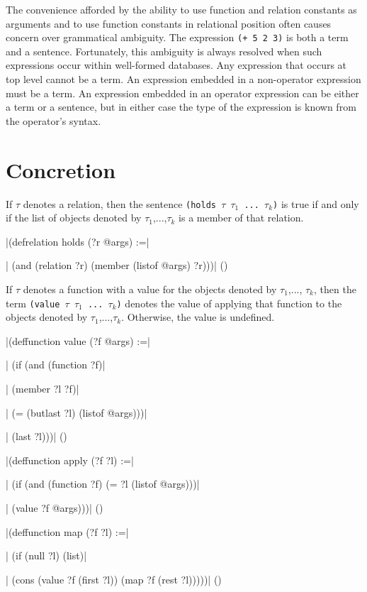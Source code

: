 The convenience afforded by the ability to use function and relation
constants as arguments and to use function constants in relational
position often causes concern over grammatical ambiguity.  The
expression {\tt (+ 5 2 3)} is both a term and a sentence.  Fortunately,
this ambiguity is always resolved when such expressions occur within
well-formed databases.  Any expression that occurs at top level cannot
be a term.  An expression embedded in a non-operator expression must be
a term.  An expression embedded in an operator expression can be either
a term or a sentence, but in either case the type of the expression is
known from the operator's syntax.

\section{Concretion}

If $\tau$ denotes a relation, then the sentence {\tt (holds $\tau$
$\tau_1$ ... $\tau_k$)} is true if and only if the list of objects
denoted by $\tau_1$,...,$\tau_k$ is a member of that relation.

\medskip
\verbatim|(defrelation holds (?r @args) :=|\par
\verbatim|  (and (relation ?r) (member (listof @args) ?r)))|
\hfill(\equation)\par 
\medskip

If $\tau$ denotes a function with a value for the objects denoted by
$\tau_1$,..., $\tau_k$, then the term {\tt (value $\tau$ $\tau_1$ ...
$\tau_k$)} denotes the value of applying that function to the objects
denoted by $\tau_1$,...,$\tau_k$.  Otherwise, the value is undefined.

\medskip
\verbatim|(deffunction value (?f @args) :=|\par
\verbatim|  (if (and (function ?f)|\par
\verbatim|           (member ?l ?f)|\par
\verbatim|           (= (butlast ?l) (listof @args)))|\par
\verbatim|      (last ?l)))|
\hfill(\equation)\par 
\medskip

\medskip
\verbatim|(deffunction apply (?f ?l) :=|\par
\verbatim|  (if (and (function ?f) (= ?l (listof @args)))|\par
\verbatim|      (value ?f @args)))|
\hfill(\equation)\par
\medskip

\medskip
\verbatim|(deffunction map (?f ?l) :=|\par
\verbatim|  (if (null ?l) (list)|\par
\verbatim|      (cons (value ?f (first ?l)) (map ?f (rest ?l)))))|
\hfill(\equation)\par
\medskip

